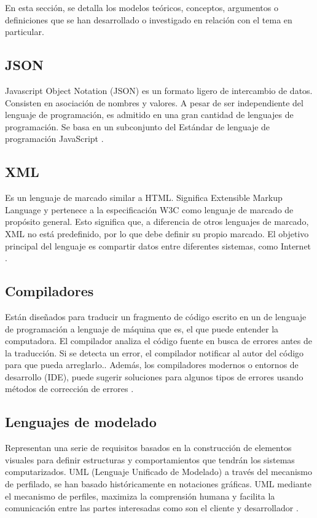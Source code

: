 	En esta sección, se detalla los modelos teóricos, conceptos, argumentos o definiciones que se han desarrollado o investigado en relación con el tema en particular.

\subsection{JSON}

Javascript Object Notation (JSON) es un formato ligero de intercambio de datos. Consisten en asociación de nombres y valores. A pesar de ser independiente del lenguaje de programación, es admitido en una gran cantidad de lenguajes de programación. Se basa en un subconjunto del Estándar de lenguaje de programación JavaScript \cite{JSON}.

\subsection{XML}

Es un lenguaje de marcado similar a HTML. Significa Extensible Markup Language y pertenece a la especificación W3C como lenguaje de marcado de propósito general. Esto significa que, a diferencia de otros lenguajes de marcado, XML no está predefinido, por lo que debe definir su propio marcado. El objetivo principal del lenguaje es compartir datos entre diferentes sistemas, como Internet \cite{XML-based}.

\subsection{Compiladores}
Están diseñados para traducir un fragmento de código escrito en un de lenguaje de programación a lenguaje de máquina que es, el que puede entender la computadora. El compilador analiza el código fuente en busca de errores antes de la traducción. Si se detecta un error, el compilador
notificar al autor del código para que pueda arreglarlo.. Además, los compiladores modernos o entornos de desarrollo (IDE), puede sugerir soluciones para algunos tipos de errores usando métodos de corrección de errores \cite{CoEdit}.

\subsection{Lenguajes de modelado}
Representan una serie de requisitos basados en la construcción de elementos visuales para definir estructuras y comportamientos que tendrán los sistemas computarizados. UML (Lenguaje Unificado de Modelado) a través del mecanismo de perfilado, se han basado históricamente en notaciones gráficas. UML mediante el mecanismo de perfiles, maximiza la comprensión humana y facilita la comunicación entre las partes interesadas como son el cliente y desarrollador \cite{Blended}. 

